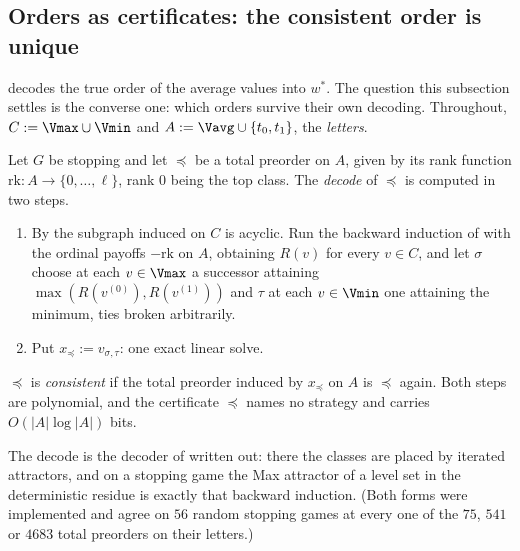 
\subsection{Orders as certificates: the consistent order is unique}
\label{ol:sec-consistent}

 decodes the true order of the average values
into $w^\ast$. The question this subsection settles is the converse one:
which orders survive their own decoding. Throughout,
$C:=\Vmax\cup\Vmin$ and $A:=\Vavg\cup\{t_0,t_1\}$, the \emph{letters}.

\begin{definition}\label{ol:def-consistent}
Let $G$ be stopping and let $\preceq$ be a total preorder on $A$, given by
its rank function $\mathrm{rk}:A\to\{0,\dots,\ell\}$, rank $0$ being the
top class. The \emph{decode} of $\preceq$ is computed in two steps.
\begin{enumerate}[label=(\roman*),leftmargin=2.2em]
\item By  the subgraph induced on $C$ is acyclic. Run the
  backward induction of  with the ordinal payoffs
  $-\mathrm{rk}$ on $A$, obtaining $R(v)$ for every $v\in C$, and let
  $\sigma$ choose at each $v\in\Vmax$ a successor attaining
  $\max(R(v^{(0)}),R(v^{(1)}))$ and $\tau$ at each $v\in\Vmin$ one attaining
  the minimum, ties broken arbitrarily.
\item Put $x_{\preceq}:=v_{\sigma,\tau}$: one exact linear solve.
\end{enumerate}
$\preceq$ is \emph{consistent} if the total preorder induced by $x_\preceq$
on $A$ is $\preceq$ again. Both steps are polynomial, and the certificate
$\preceq$ names no strategy and carries $O(|A|\log|A|)$ bits.
\end{definition}

The decode is the decoder of  written out: there
the classes are placed by iterated attractors, and on a stopping game the
Max attractor of a level set in the deterministic residue is exactly that
backward induction. (Both forms were implemented and agree on $56$ random
stopping games at every one of the $75$, $541$ or $4683$ total preorders on
their letters.)

